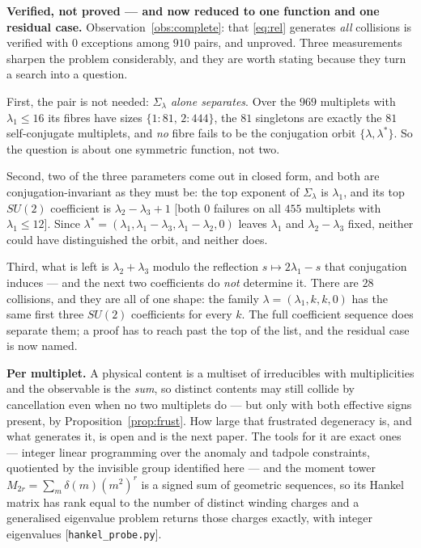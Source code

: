 \documentclass[11pt,a4paper]{article}
\newcommand{\Sig}{\Sigma_\lambda}
\begin{document}
\textbf{Verified, not proved --- and now reduced to one function and one residual case.}
Observation~\ref{obs:complete}: that \eqref{eq:rel} generates \emph{all} collisions is verified with
$0$ exceptions among $910$ pairs, and unproved. Three measurements sharpen the problem considerably, and they are worth stating because
they turn a search into a question.

First, the pair is not needed: \emph{$\Sig$ alone separates}. Over the $969$ multiplets with
$\lambda_1\le16$ its fibres have sizes $\{1:81,\,2:444\}$, the $81$ singletons are exactly the $81$
self-conjugate multiplets, and \emph{no} fibre fails to be the conjugation orbit $\{\lambda,\lambda^*\}$.
So the question is about one symmetric function, not two.

Second, two of the three parameters come out in closed form, and both are conjugation-invariant as
they must be: the top exponent of $\Sig$ is $\lambda_1$, and its top $SU(2)$ coefficient is
$\lambda_2-\lambda_3+1$ [both $0$ failures on all $455$ multiplets with $\lambda_1\le12$]. Since
$\lambda^*=(\lambda_1,\lambda_1-\lambda_3,\lambda_1-\lambda_2,0)$ leaves $\lambda_1$ and
$\lambda_2-\lambda_3$ fixed, neither could have distinguished the orbit, and neither does.

Third, what is left is $\lambda_2+\lambda_3$ modulo the reflection
$s\mapsto2\lambda_1-s$ that conjugation induces --- and the next two coefficients do \emph{not}
determine it. There are $28$ collisions, and they are all of one shape: the family
$\lambda=(\lambda_1,k,k,0)$ has the same first three $SU(2)$ coefficients for every $k$. The full
coefficient sequence does separate them; a proof has to reach past the top of the list, and the
residual case is now named.

\textbf{Per multiplet.} A physical content is a multiset of irreducibles with multiplicities and the
observable is the \emph{sum}, so distinct contents may still collide by cancellation even when no two
multiplets do --- but only with both effective signs present, by Proposition~\ref{prop:frust}. How
large that frustrated degeneracy is, and what generates it, is open and is the next paper.
The tools for it are exact ones --- integer linear programming over the anomaly and tadpole
constraints, quotiented by the invisible group identified here --- and the moment tower
$M_{2r}=\sum_m\delta(m)(m^2)^r$ is a signed sum of geometric sequences, so its Hankel matrix has rank
equal to the number of distinct winding charges and a generalised eigenvalue problem returns those
charges exactly, with integer eigenvalues [\texttt{hankel\_probe.py}].
\end{document}
